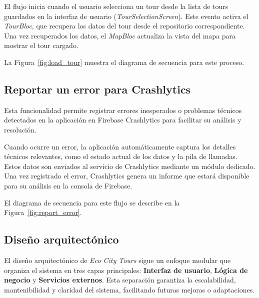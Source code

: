 El flujo inicia cuando el usuario selecciona un tour desde la lista de tours guardados en la interfaz de usuario (\textit{TourSelectionScreen}). Este evento activa el \textit{TourBloc}, que recupera los datos del tour desde el repositorio correspondiente. Una vez recuperados los datos, el \textit{MapBloc} actualiza la vista del mapa para mostrar el tour cargado. 

La Figura~\ref{fig:load_tour} muestra el diagrama de secuencia para este proceso.



\subsection{Reportar un error para Crashlytics}
Esta funcionalidad permite registrar errores inesperados o problemas técnicos detectados en la aplicación en Firebase Crashlytics para facilitar su análisis y resolución.

Cuando ocurre un error, la aplicación automáticamente captura los detalles técnicos relevantes, como el estado actual de los datos y la pila de llamadas. Estos datos son enviados al servicio de Crashlytics mediante un módulo dedicado. Una vez registrado el error, Crashlytics genera un informe que estará disponible para su análisis en la consola de Firebase.

El diagrama de secuencia para este flujo se describe en la Figura~\ref{fig:report_error}.



\subsection{Diseño arquitectónico}

El diseño arquitectónico de \textit{Eco City Tours} sigue un enfoque modular que organiza el sistema en tres capas principales: \textbf{Interfaz de usuario}, \textbf{Lógica de negocio} y \textbf{Servicios externos}. Esta separación garantiza la escalabilidad, mantenibilidad y claridad del sistema, facilitando futuras mejoras o adaptaciones.

